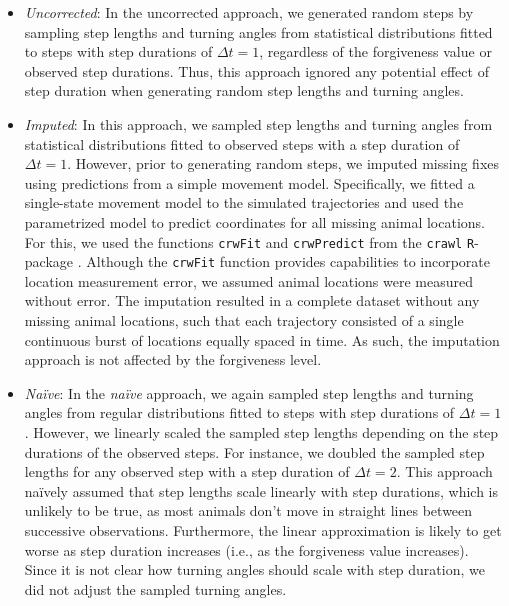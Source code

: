 \documentclass[abstract=on,10pt,a4paper,bibliography=totocnumbered]{article}
\begin{document}
\begin{itemize}

  \item \textit{Uncorrected}: In the uncorrected approach, we generated random
  steps by sampling step lengths and turning angles from statistical
  distributions fitted to steps with step durations of $\Delta t = 1$,
  regardless of the forgiveness value or observed step durations. Thus, this
  approach ignored any potential effect of step duration when generating random
  step lengths and turning angles.

  \item \textit{Imputed}: In this approach, we sampled step lengths and turning
  angles from statistical distributions fitted to observed steps with a step
  duration of $\Delta t = 1$. However, prior to generating random steps, we
  imputed missing fixes using predictions from a simple movement model.
  Specifically, we fitted a single-state movement model \citep{Johnson.2008} to
  the simulated trajectories and used the parametrized model to predict
  coordinates for all missing animal locations. For this, we used the functions
  \texttt{crwFit} and \texttt{crwPredict} from the \texttt{crawl}
  \texttt{R}-package \citep{Johnson.2022}. Although the \texttt{crwFit} function
  provides capabilities to incorporate location measurement error, we assumed
  animal locations were measured without error. The imputation resulted in a
  complete dataset without any missing animal locations, such that each
  trajectory consisted of a single continuous burst of locations equally spaced
  in time. As such, the imputation approach is not affected by the forgiveness
  level.

  \item \textit{Na\"ive}: In the \textit{na\"ive} approach, we again sampled
  step lengths and turning angles from regular distributions fitted to steps
  with step durations of $\Delta t = 1$. However, we linearly scaled the sampled
  step lengths depending on the step durations of the observed steps. For
  instance, we doubled the sampled step lengths for any observed step with a
  step duration of $\Delta t = 2$. This approach na\"ively assumed that
  step lengths scale linearly with step durations, which is unlikely to be true,
  as most animals don't move in straight lines between successive observations.
  Furthermore, the linear approximation is likely to get worse as step duration
  increases (i.e., as the forgiveness value increases). Since it is not clear
  how turning angles should scale with step duration, we did not adjust the
  sampled turning angles.


\end{itemize}
\end{document}
